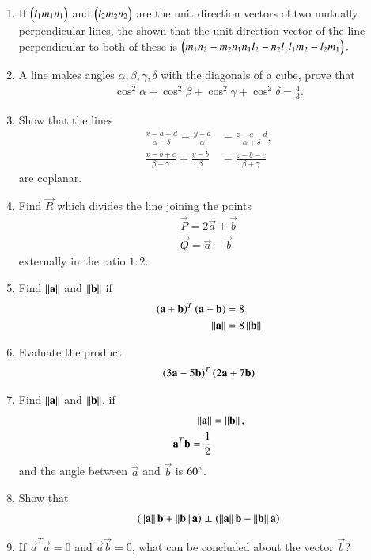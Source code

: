 \begin{enumerate}[label=\arabic*.,ref=\thesubsection.\theenumi]
\item If 
$
\begin{pmatrix}l_1m_1n_1\end{pmatrix}
$
and
$
\begin{pmatrix}l_2m_2n_2\end{pmatrix}
$
are the unit direction vectors of two mutually perpendicular lines, the shown that the unit direction vector of the line perpendicular to both of these is
$
\begin{pmatrix}m_1n_2-m_2n_1n_1l_2-n_2l_1l_1m_2-l_2m_1\end{pmatrix}.
$
\item A line makes angles $\alpha, \beta, \gamma, \delta$ with the diagonals of a cube, prove that \begin{align}
\cos^2\alpha + \cos^2\beta + \cos^2\gamma +\cos^2\delta = \frac{4}{3}.
\end{align}
\item Show that the lines 
\begin{align}
\frac{x-a+d}{\alpha-\delta} = \frac{y-a}{\alpha} &= \frac{z-a-d}{\alpha+\delta}, 
\\
\frac{x-b+c}{\beta-\gamma} = \frac{y-b}{\beta} &= \frac{z-b-c}{\beta+\gamma} 
\end{align}
%
are coplanar.
\item Find $\vec{R}$ which divides the line joining the points 
\begin{align}
\vec{P} = 2\vec{a}+\vec{b}
\\
\vec{Q} = \vec{a}-\vec{b}
\end{align}
externally in the ratio $1:2$.
\item Find $\left\lVert\mathbf{a}\right\rVert$ and $\left\lVert\mathbf{b}\right\rVert$ if 
\begin{align}
\left(\mathbf{a}+\mathbf{b}\right)^T\left(\mathbf{a}-\mathbf{b}\right) &= 8
\\
\left\lVert\mathbf{a}\right\rVert&=8\left\lVert\mathbf{b}\right\rVert
\end{align}
\item Evaluate the product 
\begin{align}
\left(3\mathbf{a}-5\mathbf{b}\right)^T\left(2\mathbf{a}+7\mathbf{b}\right) 
\end{align}
\item Find $\left\lVert\mathbf{a}\right\rVert$ and $\left\lVert\mathbf{b}\right\rVert$, if
\begin{align}
\left\lVert\mathbf{a}\right\rVert &= \left\lVert\mathbf{b}\right\rVert,
\\
\mathbf{a}^T\mathbf{b} = \frac{1}{2} 
\end{align}
and the angle between $\vec{a}$ and $\vec{b}$ is $60\degree$.
\item Show that 
\begin{align}
\left(\left\lVert\mathbf{a}\right\rVert\mathbf{b}+\left\lVert\mathbf{b}\right\rVert\mathbf{a}\right)\perp \left(\left\lVert\mathbf{a}\right\rVert\mathbf{b}-\left\lVert\mathbf{b}\right\rVert\mathbf{a}\right)\\
\end{align}
\item If $\vec{a}^T\vec{a}=0$ and  $\vec{a}\vec{b}=0$, what can be concluded about the vector $\vec{b}$?

\end{enumerate}
